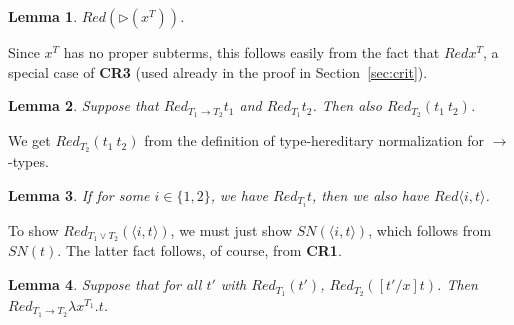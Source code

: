\documentclass{article}
\newcommand{\red}[0]{\textit{Red}}
\newcommand{\redsub}[1]{\textit{Red}(\rhd(#1))}
\newcommand{\sn}[0]{\textit{SN}}
\newtheorem{lemma}{Lemma}
\begin{document}
\begin{lemma}
$\redsub{x^T}$.
\end{lemma}

\noindent Since $x^T$ has no proper subterms, this follows easily from
the fact that $\red{x^T}$, a special case of \textbf{CR3} (used
already in the proof in Section~\ref{sec:crit}).

\begin{lemma}
Suppose that $\red_{T_1\to T_2}{t_1}$ and $\red_{T_1}{t_2}$.  Then
also $\red_{T_2}(t_1\ t_2)$.
\end{lemma}

\noindent We get $\red_{T_2}(t_1\ t_2)$ from the definition of
type-hereditary normalization for $\to$-types.

\begin{lemma}
If for some $i\in\{1,2\}$, we have $\red_{T_i}{t}$, then we also have
$\red{\langle i,t\rangle}$.
\end{lemma}

\noindent To show $\red_{T_1\vee T_2}(\langle i,t\rangle)$, we must
just show $\sn(\langle i,t\rangle)$, which follows from $\sn(t)$.  The
latter fact follows, of course, from \textbf{CR1}.  

\begin{lemma}
Suppose that for all $t'$ with $\red_{T_1}(t')$,
$\red_{T_2}([t'/x]t)$.  Then $\red_{T_1 \to T_2}{\lambda x^{T_1}. t}$.
\end{lemma}
\end{document}
